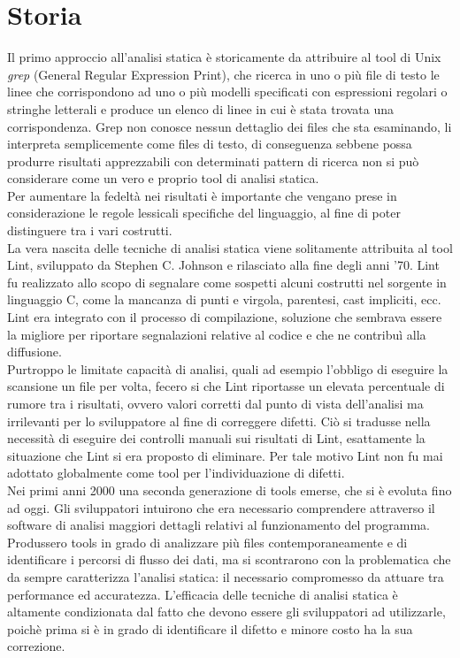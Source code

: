 \section{Storia}
Il primo approccio all'analisi statica è storicamente da attribuire al tool di Unix \emph{grep} (General Regular Expression Print), che ricerca in uno o più file di testo le linee che corrispondono ad uno o più modelli specificati con espressioni regolari o stringhe letterali e produce un elenco di linee in cui è stata trovata una corrispondenza.
Grep non conosce nessun dettaglio dei files che sta esaminando, li interpreta semplicemente come files di testo, di conseguenza sebbene possa produrre risultati apprezzabili con determinati pattern di ricerca non si può considerare come un vero e proprio tool di analisi statica. \\
Per aumentare la fedeltà nei risultati è importante che vengano prese in considerazione le regole lessicali specifiche del linguaggio, al fine di poter distinguere tra i vari costrutti.\\  
La vera nascita delle tecniche di analisi statica viene solitamente attribuita al tool Lint, sviluppato da Stephen C. Johnson e rilasciato alla fine degli anni '70. Lint fu realizzato allo scopo di segnalare come sospetti alcuni costrutti nel sorgente in linguaggio C, come la mancanza di punti e virgola, parentesi, cast impliciti, ecc. 
Lint era integrato con il processo di compilazione, soluzione che sembrava essere la migliore per riportare segnalazioni relative al codice e che ne contribuì alla diffusione.\\
Purtroppo le limitate capacità di analisi, quali ad esempio l'obbligo di eseguire la scansione un file per volta, fecero si che Lint riportasse un elevata percentuale di rumore tra i risultati, ovvero valori corretti dal punto di vista dell'analisi ma irrilevanti per lo sviluppatore al fine di correggere difetti. Ciò si tradusse nella necessità di eseguire dei controlli manuali sui risultati di Lint, esattamente la situazione che Lint si era proposto di eliminare.
Per tale motivo Lint non fu mai adottato globalmente come tool per l'individuazione di difetti.\\
Nei primi anni 2000 una seconda generazione di tools emerse, che si è evoluta fino ad oggi. Gli sviluppatori intuirono che era necessario comprendere attraverso il software di analisi maggiori dettagli relativi al funzionamento del programma. Produssero tools in grado di  analizzare più files contemporaneamente e di identificare i percorsi di flusso dei dati, ma si scontrarono con la problematica che da sempre caratterizza l'analisi statica: il necessario compromesso da attuare tra performance ed accuratezza. L'efficacia delle tecniche di analisi statica è altamente condizionata dal fatto che devono essere gli sviluppatori ad utilizzarle, poichè prima si è in grado di identificare il difetto e minore costo ha la sua correzione.

